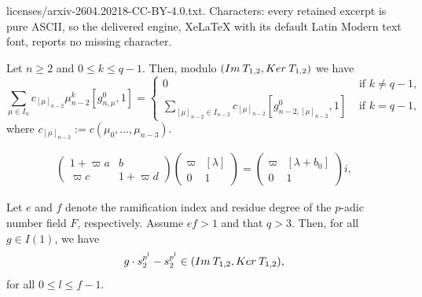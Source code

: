 \documentclass[10pt,a4paper]{amsart}
\newcommand{\Ker}{\rm{Ker}\>}
\newcommand{\im}{\rm{Im}\>}
\begin{document}
licenses/arxiv-2604.20218-CC-BY-4.0.txt. Characters: every retained excerpt is pure ASCII, so the delivered engine, XeLaTeX with its default Latin Modern text font, reports no missing character.
\begin{lemma}\label{snk like terms}
    Let $n \geq 2$ and $0\leq k \leq q-1$. Then, modulo $({\im} T_{1, 2}, {\Ker} T_{1, 2})$ we have
    \[
        \sum_{\mu \in I_n}c_{[\mu]_{n - 2}}\mu_{n - 2}^{k}\left[g^0_{n, \mu}, 1\right] =
        \begin{cases}
            0 & \text{ if } k \neq q - 1, \\
            \displaystyle\sum_{[\mu]_{n - 2} \in I_{n - 2}}\!\!\!\!\!c_{[\mu]_{n - 2}}[g^0_{n - 2, [\mu]_{n - 2}}, 1] & \text{ if } k = q - 1,
        \end{cases}
    \]
where $c_{[\mu]_{n - 2}} := c(\mu_0, \ldots, \mu_{n - 3})$.
\end{lemma}

    \begin{eqnarray}\label{Arindam's identity stolen}
        \begin{pmatrix}
            1 + \varpi a & b \\ \varpi c & 1 + \varpi d
        \end{pmatrix}
        \begin{pmatrix}
            \varpi & [\lambda] \\ 0 & 1
        \end{pmatrix}
        =
        \begin{pmatrix}
            \varpi & [\lambda + b_0] \\ 0 & 1
        \end{pmatrix}i,
    \end{eqnarray}

\begin{proposition}\label{sn1 are invariant}
Let $e$ and $f$ denote the ramification index and residue degree of the $p$-adic number field $F$, respectively. Assume $ef > 1$ and that $q > 3$. Then, for all $g \in I(1)$, we have 
   $$g \cdot s_{2}^{p^l}-s_{2}^{p^l} \in ({\im}T_{1,2},{\Ker}T_{1,2}),$$
    for all $0 \leq l \leq f-1$. 
    
\end{proposition}
\end{document}
